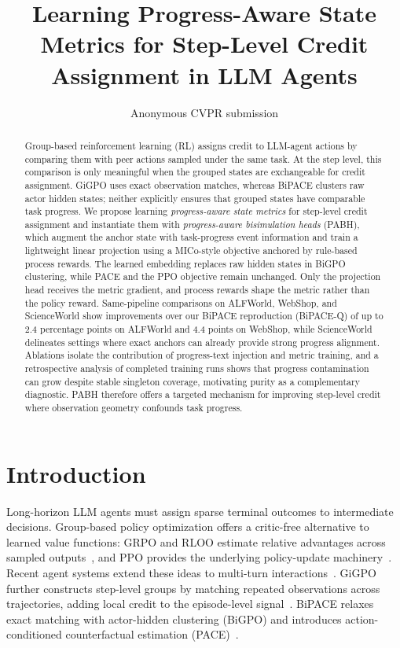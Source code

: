 \documentclass[10pt,twocolumn,letterpaper]{article}
\newcommand{\method}{PABH\xspace}
\begin{document}
\title{Learning Progress-Aware State Metrics for Step-Level Credit\\Assignment in LLM Agents}
\author{Anonymous CVPR submission}
\maketitle

\begin{abstract}
Group-based reinforcement learning (RL) assigns credit to LLM-agent actions by comparing them with peer actions sampled under the same task. At the step level, this comparison is only meaningful when the grouped states are exchangeable for credit assignment. GiGPO uses exact observation matches, whereas BiPACE clusters raw actor hidden states; neither explicitly ensures that grouped states have comparable task progress. We propose learning \emph{progress-aware state metrics} for step-level credit assignment and instantiate them with \emph{progress-aware bisimulation heads} (\method), which augment the anchor state with task-progress event information and train a lightweight linear projection using a MICo-style objective anchored by rule-based process rewards. The learned embedding replaces raw hidden states in BiGPO clustering, while PACE and the PPO objective remain unchanged. Only the projection head receives the metric gradient, and process rewards shape the metric rather than the policy reward. Same-pipeline comparisons on ALFWorld, WebShop, and ScienceWorld show improvements over our BiPACE reproduction (BiPACE-Q) of up to 2.4 percentage points on ALFWorld and 4.4 points on WebShop, while ScienceWorld delineates settings where exact anchors can already provide strong progress alignment. Ablations isolate the contribution of progress-text injection and metric training, and a retrospective analysis of completed training runs shows that progress contamination can grow despite stable singleton coverage, motivating purity as a complementary diagnostic. \method therefore offers a targeted mechanism for improving step-level credit where observation geometry confounds task progress.
\end{abstract}

\section{Introduction}
\label{sec:intro}

Long-horizon LLM agents must assign sparse terminal outcomes to intermediate decisions. Group-based policy optimization offers a critic-free alternative to learned value functions: GRPO and RLOO estimate relative advantages across sampled outputs~\cite{grpo,rloo,deepseek_r1}, and PPO provides the underlying policy-update machinery~\cite{ppo,sutton,gae}. Recent agent systems extend these ideas to multi-turn interactions~\cite{ragen,loop,archer}. GiGPO further constructs step-level groups by matching repeated observations across trajectories, adding local credit to the episode-level signal~\cite{gigpo}. BiPACE relaxes exact matching with actor-hidden clustering (BiGPO) and introduces action-conditioned counterfactual estimation (PACE)~\cite{bipace}.
\end{document}
